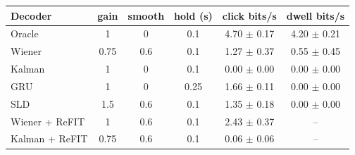 \begin{tabular}{lccccc}
\toprule
Decoder & gain & smooth & hold (s) & click bits/s & dwell bits/s \\
\midrule
Oracle & 1 & 0 & 0.1 & 4.70 $\pm$ 0.17 & 4.20 $\pm$ 0.21 \\
Wiener & 0.75 & 0.6 & 0.1 & 1.27 $\pm$ 0.37 & 0.55 $\pm$ 0.45 \\
Kalman & 1 & 0 & 0.1 & 0.00 $\pm$ 0.00 & 0.00 $\pm$ 0.00 \\
GRU & 1 & 0 & 0.25 & 1.66 $\pm$ 0.11 & 0.00 $\pm$ 0.00 \\
SLD & 1.5 & 0.6 & 0.1 & 1.35 $\pm$ 0.18 & 0.00 $\pm$ 0.00 \\
Wiener + ReFIT & 1 & 0.6 & 0.1 & 2.43 $\pm$ 0.37 & -- \\
Kalman + ReFIT & 0.75 & 0.6 & 0.1 & 0.06 $\pm$ 0.06 & -- \\
\bottomrule
\end{tabular}
